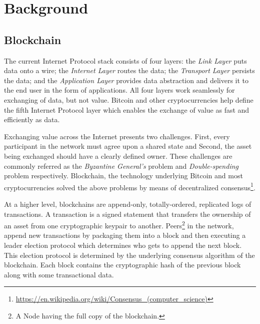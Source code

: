 \section{Background}\label{sec::background}

\subsection{Blockchain}

The current Internet Protocol stack consists of four layers: the \textit{Link Layer} puts data onto a wire; the \textit{Internet Layer} routes the data; the \textit{Transport Layer} persists the data; and the \textit{Application Layer} provides data abstraction and delivers it to the end user in the form of applications. All four layers work seamlessly for exchanging of data, but not value. Bitcoin\cite{nakamoto2008bitcoin} and other cryptocurrencies help define the fifth Internet Protocol layer which enables the exchange of value as fast and efficiently as data\cite{raval2016decentralized}.

Exchanging value across the Internet presents two challenges. First, every participant in the network must agree upon a shared state and Second, the asset being exchanged should have a clearly defined owner. These challenges are commonly referred as the \textit{Byzantine General's} problem\cite{lamport1982byzantine} and \textit{Double-spending} problem\cite{chohan2017double} respectively. Blockchain, the technology underlying Bitcoin and most cryptocurrencies solved the above problems by means of decentralized consensus\footnote{\url{https://en.wikipedia.org/wiki/Consensus_(computer_science)}}.

At a higher level, blockchains are append-only, totally-ordered, replicated logs of transactions\cite{bonneau2015research}. A transaction is a signed statement that transfers the ownership of an asset from one cryptographic keypair to another. Peers\footnote{A Node having the full copy of the blockchain.} in the network, append new transactions by packaging them into a block and then executing a leader election protocol which determines who gets to append the next block\cite{nelson2016extending}. This election protocol is determined by the underlying consensus algorithm of the blockchain. Each block contains the cryptographic hash of the previous block along with some transactional data.